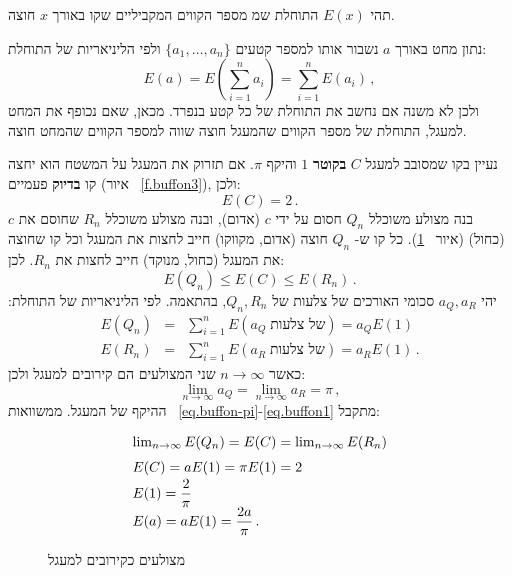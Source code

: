 תהי 
$E(x)$
התוחלת שמ מספר הקווים המקביליים שקו באורך
$x$
חוצה.

נתון מחט באורך
$a$
נשבור אותו למספר קטעים
$\{a_1,\ldots,a_n\}$
ולפי הליניאריות של התוחלת:
\[
E(a) = E\left(\sum_{i=1}^{n} a_i\right) = \sum_{i=1}^{n} E(a_i)\,, 
\]
ולכן לא משנה אם נחשב את התוחלת של כל קטע בנפרד. מכאן, שאם נכופף את המחט למעגל, התוחלת של מספר הקווים שהמעגל חוצה שווה למספר הקווים שהמחט חוצה.

נעיין בקו שמסובב למעגל
$C$
\textbf{בקוטר}
$1$
והיקף
$\pi$.
אם תזרוק את המעגל על המשטח הוא יחצה קו 
\textbf{בדיוק}
פעמיים (איור%
~\ref{f.buffon3}),
ולכן:
\begin{equation}\label{eq.buffon-2}
E(C)=2\,.
\end{equation}
בנה מצולע משוכלל
$Q_n$
חסום על ידי 
$c$
(אדום), ובנה מצולע משוכלל 
$R_n$
שחוסם את
$c$
(כחול) (איור%
~\ref{f.buffon4}). 
כל קו ש-%
$Q_n$
חוצה (אדום, מקווקו) חייב לחצות את המעגל וכל קו שחוצה את המעגל (כחול, מנוקד) חייב לחצות את 
$R_n$.
לכן:
\begin{equation}\label{eq.buffon3}
E(Q_n)\leq E(C)\leq E(R_n)\,.
\end{equation}
יהי 
$a_Q, a_R$
סכומי האורכים של צלעות של
$Q_n,R_n$,
בהתאמה. לפי הליניאריות של התוחלת:
{
\addtolength{\arraycolsep}{-3pt}
\begin{eqnarray}\label{eq.buffon1}
E(Q_n)&=&\sum_{i=1}^n E(a_Q\;\textrm{של צלעות})=a_QE(1)\\
\label{eq.buffon1b}E(R_n)&=&\sum_{i=1}^n E(a_R\;\textrm{של צלעות})=a_RE(1)\,. 
\end{eqnarray}
}
כאשר 
$n\rightarrow\infty$
שני המצולעים הם קירובים למעגל ולכן:
\begin{equation}\label{eq.buffon-pi}
\lim_{n\rightarrow\infty}a_Q = \lim_{n\rightarrow\infty} a_R=\pi\,,
\end{equation}
ההיקף של המעגל. ממשוואות%
~\ref{eq.buffon-pi}-\ref{eq.buffon1}
מתקבל:
\[
\renewcommand*{\arraystretch}{1.5}
\begin{array}{l}
\lim_{n\rightarrow\infty}E(Q_n)=E(C) =\lim_{n\rightarrow\infty}E(R_n)\\
E(C)=aE(1) =\pi E(1) = 2\\
E(1)=\disfrac{2}{\pi}\\
E(a)=aE(1)=\disfrac{2a}{\pi}\,.
\end{array}
\]
\begin{figure}[bt]
\begin{center}
\end{center}
\caption{מצולעים כקירובים למעגל}\label{f.buffon4}
\end{figure}

